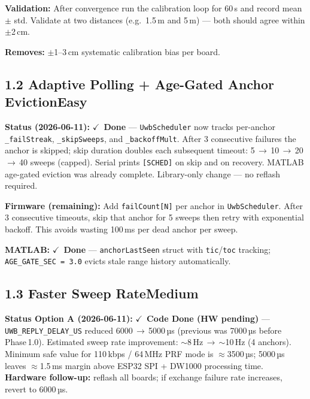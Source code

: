 \documentclass[11pt,a4paper]{article}
\newcommand{\dif}[1]{\texorpdfstring{\hfill#1}{}}
\newcommand{\easy}{\textcolor{dkgreen}{\textbf{Easy}}}
\newcommand{\medium}{\textcolor{dkorange}{\textbf{Medium}}}
\newcommand{\done}{\texorpdfstring{\textcolor{dkgreen}{$\checkmark$~\textbf{Done}}}{[Done]}}
\newcommand{\codehwdone}{\texorpdfstring{\textcolor{dkorange}{$\checkmark$~\textbf{Code Done (HW pending)}}}{[Code Done, HW pending]}}
\begin{document}
\textbf{Validation:} After convergence run the calibration loop for 60\,s and record mean $\pm$ std. Validate at two distances (e.g.\ 1.5\,m and 5\,m) --- both should agree within $\pm$2\,cm.

\textbf{Removes:} $\pm$1--3\,cm systematic calibration bias per board.

\subsection{1.2 Adaptive Polling + Age-Gated Anchor Eviction\dif{\easy}}

\begin{donebox}
\textbf{Status (2026-06-11):} \done{} --- \texttt{UwbScheduler} now tracks per-anchor \texttt{\_failStreak}, \texttt{\_skipSweeps}, and \texttt{\_backoffMult}. After 3 consecutive failures the anchor is skipped; skip duration doubles each subsequent timeout: 5\,$\to$\,10\,$\to$\,20\,$\to$\,40 sweeps (capped). Serial prints \texttt{[SCHED]} on skip and on recovery. MATLAB age-gated eviction was already complete. Library-only change --- no reflash required.
\end{donebox}

\textbf{Firmware (remaining):} Add \texttt{failCount[N]} per anchor in \texttt{UwbScheduler}. After 3 consecutive timeouts, skip that anchor for 5 sweeps then retry with exponential backoff. This avoids wasting 100\,ms per dead anchor per sweep.

\textbf{MATLAB:} \done{} --- \texttt{anchorLastSeen} struct with \texttt{tic}/\texttt{toc} tracking; \texttt{AGE\_GATE\_SEC = 3.0} evicts stale range history automatically.

\subsection{1.3 Faster Sweep Rate\dif{\medium}}

\begin{codehwbox}
\textbf{Status Option A (2026-06-11):} \codehwdone{} --- \texttt{UWB\_REPLY\_DELAY\_US} reduced 6000\,$\to$\,5000\,µs (previous was 7000\,µs before Phase\,1.0). Estimated sweep rate improvement: $\sim$8\,Hz\,$\to$\,$\sim$10\,Hz (4 anchors). Minimum safe value for 110\,kbps / 64\,MHz PRF mode is $\approx$3500\,µs; 5000\,µs leaves $\approx$1.5\,ms margin above ESP32 SPI + DW1000 processing time. \textbf{Hardware follow-up:} reflash all boards; if exchange failure rate increases, revert to 6000\,µs.
\end{codehwbox}
\end{document}
